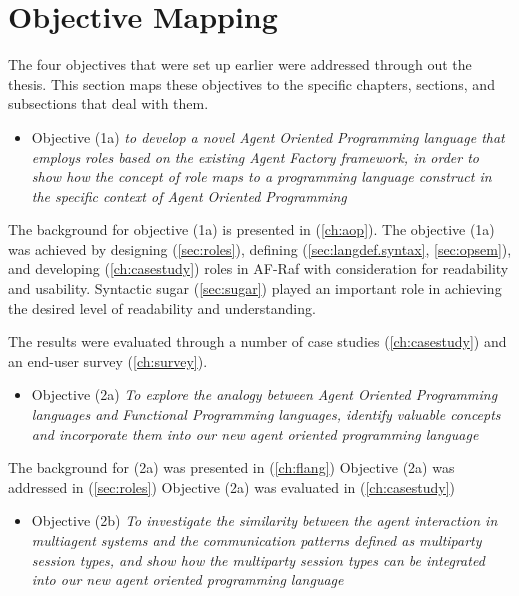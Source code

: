 \documentclass[a4paper,12pt,oneside,fleqn]{book} %
\begin{document}

\section{Objective Mapping} %

The four objectives that were set up earlier were addressed through out the
thesis. This section maps these objectives to the specific chapters,
sections, and subsections that deal with them.

\begin{itemize}
  \item Objective (1a) \textit{to develop a novel Agent Oriented Programming language that employs roles based on the existing Agent Factory framework, in order to show how the concept of role maps to a programming language construct in the specific context of Agent Oriented Programming} 
\end{itemize}

The background for objective (1a) is presented in (\autoref{ch:aop}).
The objective (1a) was achieved by designing (\autoref{sec:roles}),
defining (\autoref{sec:langdef.syntax}, \autoref{sec:opsem}), and
developing (\autoref{ch:casestudy}) roles in AF-Raf with consideration for
readability and usability. Syntactic sugar (\autoref{sec:sugar}) played an
important role in achieving the desired level of readability and
understanding.

The results were evaluated through a number of case studies
(\autoref{ch:casestudy}) and an end-user survey (\autoref{ch:survey}).


\begin{itemize}
  \item Objective (2a) \textit{To explore the analogy between Agent
    Oriented Programming languages and Functional Programming languages,
    identify valuable concepts and incorporate them into our new agent
  oriented programming language}
\end{itemize}

The background for (2a) was presented in (\autoref{ch:flang})
Objective (2a) was addressed in (\autoref{sec:roles})
Objective (2a) was  evaluated in (\autoref{ch:casestudy})

\begin{itemize}
\item Objective (2b) \textit{To investigate the similarity between
    the agent interaction in multiagent systems and the communication
    patterns defined as multiparty session types, and show how the
    multiparty session types can be integrated into our new agent oriented
  programming language}
\end{itemize}
  
\end{document}
